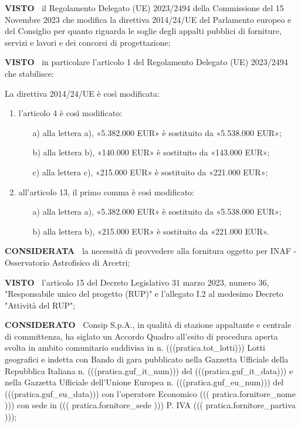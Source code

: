 \textbf{VISTO~} il Regolamento Delegato (UE)
2023/2494 della Commissione del 15 Novembre 2023 che modifica la direttiva
2014/24/UE del Parlamento europeo e del Consiglio per quanto riguarda
le soglie degli appalti pubblici di forniture, servizi e lavori e dei
concorsi di progettazione;

\textbf{VISTO~}  in particolare l'articolo 1 del Regolamento Delegato (UE)
2023/2494 che stabilisce:

La direttiva 2014/24/UE è così modificata: 
\begin{enumerate}
\item l'articolo 4 è così modificato: 
\begin{enumerate}
\item[a)]  alla lettera a), «5.382.000 EUR» è sostituito da «5.538.000 EUR»;
\item[b)]  alla lettera b), «140.000 EUR» è sostituito da «143.000 EUR»; 
\item[c)]  alla lettera c), «215.000 EUR» è sostituito da «221.000 EUR»; 
\end{enumerate}

\item all'articolo 13, il primo comma è così modificato: 
\begin{enumerate}
\item[a)]  alla lettera a), «5.382.000 EUR» è sostituito da «5.538.000 EUR»; 
\item[b)]  alla lettera b), «215.000 EUR» è sostituito da «221.000 EUR».
\end{enumerate}
\end{enumerate}

\textbf{CONSIDERATA~} la necessità di provvedere alla fornitura oggetto per
INAF - Osservatorio Astrofisico di Arcetri;

\textbf{VISTO~} l'articolo 15 del Decreto Legislativo 31
marzo 2023, numero 36, "Responsabile unico del progetto (RUP)" e
l'allegato I.2 al medesimo Decreto "Attività del RUP";

\textbf{CONSIDERATO~} Consip S.p.A., in qualità di stazione appaltante e centrale di 
committenza,  ha siglato un Accordo Quadro all’esito di procedura aperta svolta in ambito
 comunitario suddivisa in n. (((pratica.tot_lotti))) Lotti geografici e indetta con Bando
di gara pubblicato nella Gazzetta Ufficiale della Repubblica Italiana n. 
(((pratica.guf_it_num))) del (((pratica.guf_it_data))) e nella
 Gazzetta Ufficiale dell’Unione Europea n. (((pratica.guf_eu_num)))
del (((pratica.guf_eu_data)))  con l'operatore Economico
 ((( pratica.fornitore_nome ))) con sede in ((( pratica.fornitore_sede )))
P. IVA ((( pratica.fornitore_partiva )));

